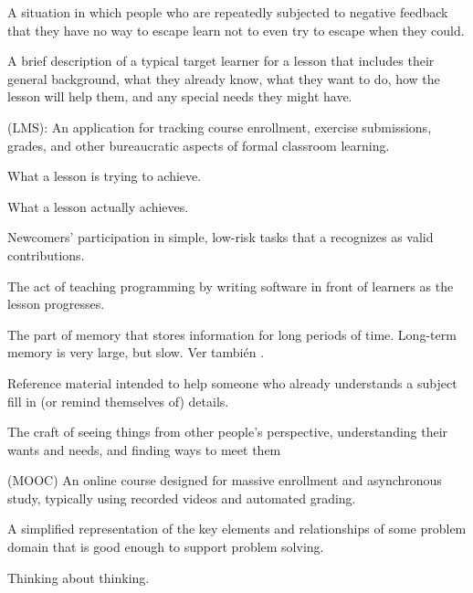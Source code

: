 \begin{description}
 A situation in which
people who are repeatedly subjected to negative feedback that they have no way
to escape learn not to even try to escape when they could.

 A brief description of a typical
target learner for a lesson that includes their general background, what they
already know, what they want to do, how the lesson will help them, and any
special needs they might have.

 (LMS): An application for tracking course
enrollment, exercise submissions, grades, and other bureaucratic aspects of
formal classroom learning.

 What a lesson is trying to
achieve.

 What a lesson actually achieves.

 Newcomers' participation in simple, low-risk tasks that a
 recognizes as valid contributions.

 The act of teaching programming by writing
software in front of learners as the lesson progresses.

 The part of memory that stores
information for long periods of time. Long-term memory is very large, but
slow. Ver también .

 Reference material intended to help someone who
already understands a subject fill in (or remind themselves of) details.

 The craft of seeing things from other people's
perspective, understanding their wants and needs, and finding ways to meet them

 (MOOC) An online course designed
for massive enrollment and asynchronous study, typically using recorded videos
and automated grading.

 A simplified representation of the key
elements and relationships of some problem domain that is good enough to support
problem solving.

 Thinking about thinking.


\end{description}
